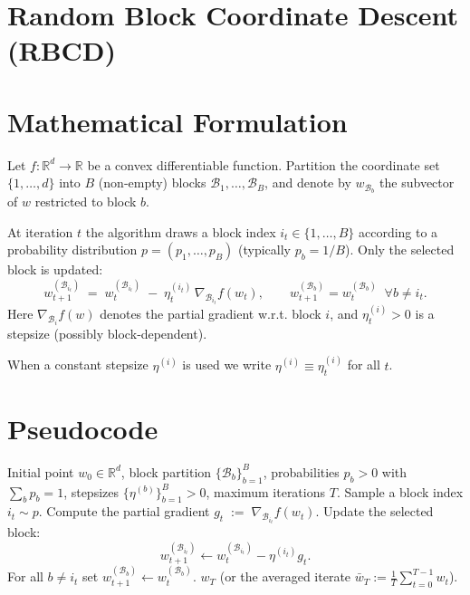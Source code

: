\documentclass{article}
\newcommand{\R}{\mathbb{R}}
\begin{document}
\section*{Random Block Coordinate Descent (RBCD)}

\section*{Mathematical Formulation}
Let $f:\R^{d}\rightarrow\R$ be a convex differentiable function.  
Partition the coordinate set $\{1,\dots ,d\}$ into $B$ (non‑empty) blocks 
$\mathcal{B}_{1},\dots ,\mathcal{B}_{B}$, and denote by $w_{\mathcal{B}_{b}}$ the subvector of $w$ restricted to block $b$.  

At iteration $t$ the algorithm draws a block index $i_{t}\in\{1,\dots ,B\}$ 
according to a probability distribution $p=(p_{1},\dots ,p_{B})$ (typically $p_{b}=1/B$).  
Only the selected block is updated:
\[
\boxed{
w_{t+1}^{(\mathcal{B}_{i_{t}})} \;=\; w_{t}^{(\mathcal{B}_{i_{t}})}\;-\;\eta_{t}^{(i_{t})}\,
\nabla_{\mathcal{B}_{i_{t}}}f(w_{t}) ,
\qquad 
w_{t+1}^{(\mathcal{B}_{b})}=w_{t}^{(\mathcal{B}_{b})}\;\;\forall b\neq i_{t}.
}
\tag{1}
\]
Here $\nabla_{\mathcal{B}_{i}}f(w)$ denotes the partial gradient w.r.t. block $i$,
and $\eta_{t}^{(i)}>0$ is a stepsize (possibly block‑dependent).  

When a constant stepsize $\eta^{(i)}$ is used we write $\eta^{(i)}\equiv \eta_{t}^{(i)}$ for all $t$.

\section*{Pseudocode}
\begin{algorithm}[H]
\caption{Random Block Coordinate Descent (RBCD)}\label{alg:RBCD}
\begin{algorithmic}[1]
\REQUIRE Initial point $w_{0}\in\R^{d}$, block partition $\{\mathcal{B}_{b}\}_{b=1}^{B}$,
probabilities $p_{b}>0$ with $\sum_{b}p_{b}=1$, stepsizes $\{\eta^{(b)}\}_{b=1}^{B}>0$,
maximum iterations $T$.
    \STATE Sample a block index $i_{t}\sim p$.
    \STATE Compute the partial gradient $g_{t}\;:=\;\nabla_{\mathcal{B}_{i_{t}}}f(w_{t})$.
    \STATE Update the selected block:
    \[
    w_{t+1}^{(\mathcal{B}_{i_{t}})} \gets w_{t}^{(\mathcal{B}_{i_{t}})}-\eta^{(i_{t})}g_{t}.
    \]
    \STATE For all $b\neq i_{t}$ set $w_{t+1}^{(\mathcal{B}_{b})}\gets w_{t}^{(\mathcal{B}_{b})}$.
\ENDFOR
\RETURN $w_{T}$ (or the averaged iterate $\bar w_{T}:=\frac{1}{T}\sum_{t=0}^{T-1}w_{t}$).
\end{algorithmic}
\end{algorithm}
\end{document}
